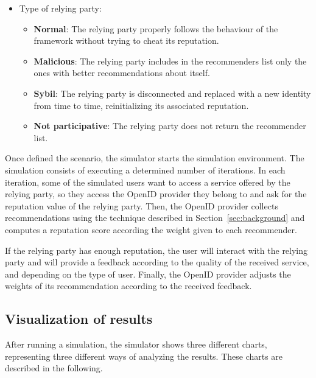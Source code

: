 \documentclass{llncs}
\begin{document}
\begin{itemize}
\item Type of relying party:
\begin{itemize}
\item \textbf{Normal}: The relying party properly follows the behaviour of the framework without trying to cheat its reputation.

\item \textbf{Malicious}: The relying party includes in the recommenders list only the ones with better recommendations about itself.

\item \textbf{Sybil}: The relying party is disconnected and replaced with a new identity from time to time, reinitializing its associated reputation.

\item \textbf{Not participative}: The relying party does not
return the recommender list.
\end{itemize}

\end{itemize}

Once defined the scenario, the simulator starts the simulation environment. The simulation consists of executing a determined number of iterations. In each iteration, some of the simulated users want to access a service offered by the relying party, so they access the OpenID provider they belong to and ask for the reputation value of the relying party. Then, the OpenID provider collects recommendations using the technique described in Section~\ref{sec:background} and computes a reputation score according the weight given to each recommender.

If the relying party has enough reputation, the user will interact with the relying party and will provide a feedback according to the quality of the received service, and depending on the type of user. Finally, the OpenID provider adjusts the weights of its recommendation according to the received feedback.

\subsection{Visualization of results}

After running a simulation, the simulator shows three different charts, representing three different ways of analyzing the results. These charts are described in the following.
\end{document}
